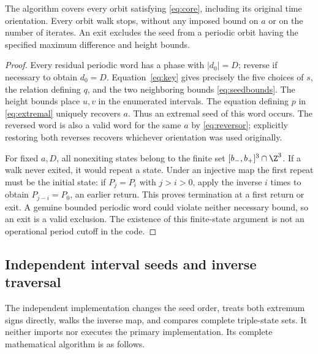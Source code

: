 \begin{lemma}
\label{lem:certificate}
The algorithm covers every orbit satisfying \eqref{eq:core},
including its original time orientation. Every orbit walk stops,
without any imposed bound on $a$ or on the number of iterates.
An exit excludes the seed from a periodic orbit having the
specified maximum difference and height bounds.
\end{lemma}
\begin{proof}
Every residual periodic word has a phase with $|d_0|=D$;
reverse if necessary to obtain $d_0=D$. Equation~\eqref{eq:key}
gives precisely the five choices of $s$, the relation defining
$q$, and the two neighboring bounds \eqref{eq:seedbounds}.
The height bounds place $u,v$ in the enumerated intervals.
The equation defining $p$ in \eqref{eq:extremal} uniquely
recovers $a$. Thus an extremal seed of this word occurs.
The reversed word is also a valid word for the same $a$ by
\eqref{eq:reversor}; explicitly restoring both reverses
recovers whichever orientation was used originally.

For fixed $a,D$, all nonexiting states belong to the finite
set $[b_-,b_+]^3\cap\Z^3$. If a walk never exited, it
would repeat a state. Under an injective map the first repeat
must be the initial state: if $P_j=P_i$ with $j>i>0$,
apply the inverse $i$ times to obtain $P_{j-i}=P_0$, an
earlier return. This proves termination at a first return or
exit. A genuine bounded periodic word could violate neither
necessary bound, so an exit is a valid exclusion. The
existence of this finite-state argument is not an operational
period cutoff in the code.
\end{proof}

\subsection{Independent interval seeds and inverse traversal}
The independent implementation changes the seed order, treats
both extremum signs directly, walks the inverse map, and compares
complete triple-state sets. It neither imports nor executes the
primary implementation. Its complete mathematical algorithm is
as follows.

